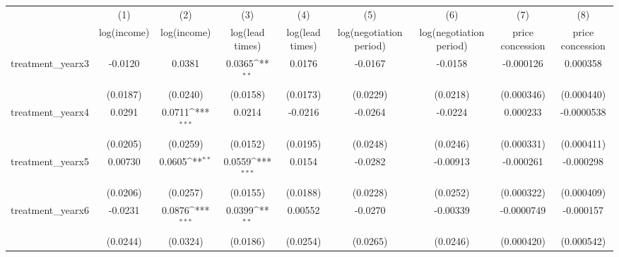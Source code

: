 {
\def\sym#1{\ifmmode^{#1}\else\(^{#1}\)\fi}
\begin{tabular}{l*{8}{c}}
\toprule
            &\multicolumn{1}{c}{(1)}&\multicolumn{1}{c}{(2)}&\multicolumn{1}{c}{(3)}&\multicolumn{1}{c}{(4)}&\multicolumn{1}{c}{(5)}&\multicolumn{1}{c}{(6)}&\multicolumn{1}{c}{(7)}&\multicolumn{1}{c}{(8)}\\
            &\multicolumn{1}{c}{log(income)}&\multicolumn{1}{c}{log(income)}&\multicolumn{1}{c}{log(lead times)}&\multicolumn{1}{c}{log(lead times)}&\multicolumn{1}{c}{log(negotiation period)}&\multicolumn{1}{c}{log(negotiation period)}&\multicolumn{1}{c}{price concession}&\multicolumn{1}{c}{price concession}\\
\midrule
treatment\_yearx3&     -0.0120         &      0.0381         &      0.0365\sym{**} &      0.0176         &     -0.0167         &     -0.0158         &   -0.000126         &    0.000358         \\
            &    (0.0187)         &    (0.0240)         &    (0.0158)         &    (0.0173)         &    (0.0229)         &    (0.0218)         &  (0.000346)         &  (0.000440)         \\
\addlinespace
treatment\_yearx4&      0.0291         &      0.0711\sym{***}&      0.0214         &     -0.0216         &     -0.0264         &     -0.0224         &    0.000233         &  -0.0000538         \\
            &    (0.0205)         &    (0.0259)         &    (0.0152)         &    (0.0195)         &    (0.0248)         &    (0.0246)         &  (0.000331)         &  (0.000411)         \\
\addlinespace
treatment\_yearx5&     0.00730         &      0.0605\sym{**} &      0.0559\sym{***}&      0.0154         &     -0.0282         &    -0.00913         &   -0.000261         &   -0.000298         \\
            &    (0.0206)         &    (0.0257)         &    (0.0155)         &    (0.0188)         &    (0.0228)         &    (0.0252)         &  (0.000322)         &  (0.000409)         \\
\addlinespace
treatment\_yearx6&     -0.0231         &      0.0876\sym{***}&      0.0399\sym{**} &     0.00552         &     -0.0270         &    -0.00339         &  -0.0000749         &   -0.000157         \\
            &    (0.0244)         &    (0.0324)         &    (0.0186)         &    (0.0254)         &    (0.0265)         &    (0.0246)         &  (0.000420)         &  (0.000542)         \\

\end{tabular}}
